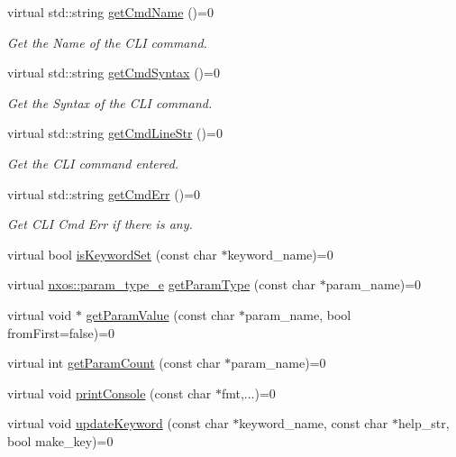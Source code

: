 \begin{DoxyCompactItemize}
virtual std\+::string \mbox{\hyperlink{classnxos_1_1_nx_cli_cmd_acf95739336bb525d749a8e73949cb887}{get\+Cmd\+Name}} ()=0
\begin{DoxyCompactList}\small\item\em Get the Name of the C\+LI command. \end{DoxyCompactList}\item 
virtual std\+::string \mbox{\hyperlink{classnxos_1_1_nx_cli_cmd_a0568d5404d91ddb89135e632e05d7abe}{get\+Cmd\+Syntax}} ()=0
\begin{DoxyCompactList}\small\item\em Get the Syntax of the C\+LI command. \end{DoxyCompactList}\item 
virtual std\+::string \mbox{\hyperlink{classnxos_1_1_nx_cli_cmd_a3d856a7d4350f027df53960053901c96}{get\+Cmd\+Line\+Str}} ()=0
\begin{DoxyCompactList}\small\item\em Get the C\+LI command entered. \end{DoxyCompactList}\item 
virtual std\+::string \mbox{\hyperlink{classnxos_1_1_nx_cli_cmd_aa4321d9b60ecb1366157d0ef9356ffbf}{get\+Cmd\+Err}} ()=0
\begin{DoxyCompactList}\small\item\em Get C\+LI Cmd Err if there is any. \end{DoxyCompactList}\item 
virtual bool \mbox{\hyperlink{classnxos_1_1_nx_cli_cmd_af100c6495c0e383c8e3d11d5cdb68cd2}{is\+Keyword\+Set}} (const char $\ast$keyword\+\_\+name)=0
\item 
virtual \mbox{\hyperlink{namespacenxos_ad220d5ba6a2a5d7edeab55cb89d309ea}{nxos\+::param\+\_\+type\+\_\+e}} \mbox{\hyperlink{classnxos_1_1_nx_cli_cmd_ab3722b567439f8ebd6422a5727bb7af6}{get\+Param\+Type}} (const char $\ast$param\+\_\+name)=0
\item 
virtual void $\ast$ \mbox{\hyperlink{classnxos_1_1_nx_cli_cmd_a827bd696ec228767cb1f6dbfdbbd271c}{get\+Param\+Value}} (const char $\ast$param\+\_\+name, bool from\+First=false)=0
\item 
virtual int \mbox{\hyperlink{classnxos_1_1_nx_cli_cmd_a12e56ced4646ba1a27417030c0d20e7b}{get\+Param\+Count}} (const char $\ast$param\+\_\+name)=0
\item 
virtual void \mbox{\hyperlink{classnxos_1_1_nx_cli_cmd_a10c723c79d75ac2c85821b5ca6540c62}{print\+Console}} (const char $\ast$fmt,...)=0
\item 
virtual void \mbox{\hyperlink{classnxos_1_1_nx_cli_cmd_ae1669d9fbeaa164494a503379ca52b86}{update\+Keyword}} (const char $\ast$keyword\+\_\+name, const char $\ast$help\+\_\+str, bool make\+\_\+key)=0
\end{DoxyCompactItemize}


